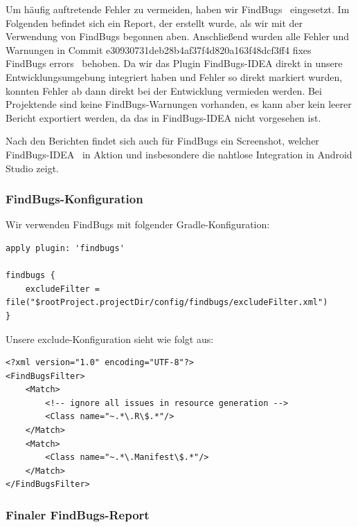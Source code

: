 
Um häufig auftretende Fehler zu vermeiden, haben wir \glqq FindBugs\grqq~ eingesetzt. Im Folgenden befindet sich ein Report, der erstellt wurde, als wir mit der Verwendung von FindBugs begonnen aben. Anschließend wurden alle Fehler und Warnungen in Commit e30930731deb28b4af37f4d820a163f48dcf3ff4 \glqq fixes FindBugs errors\grqq~ behoben. Da wir das Plugin FindBugs-IDEA direkt in unsere Entwicklungsumgebung integriert haben und Fehler so direkt markiert wurden, konnten Fehler ab dann direkt bei der Entwicklung vermieden werden. Bei Projektende sind keine FindBugs-Warnungen vorhanden, es kann aber kein leerer Bericht exportiert werden, da das in FindBugs-IDEA nicht vorgesehen ist.

Nach den Berichten findet sich auch für FindBugs ein Screenshot, welcher \glqq FindBugs-IDEA\grqq~ in Aktion und insbesondere die nahtlose Integration in Android Studio zeigt.

\subsubsection{FindBugs-Konfiguration}

Wir verwenden FindBugs mit folgender Gradle-Konfiguration:

\begin{lstlisting}
apply plugin: 'findbugs'

findbugs {
    excludeFilter = file("$rootProject.projectDir/config/findbugs/excludeFilter.xml")
}
\end{lstlisting}

Unsere exclude-Konfiguration sieht wie folgt aus:

\begin{lstlisting}
<?xml version="1.0" encoding="UTF-8"?>
<FindBugsFilter>
    <Match>
        <!-- ignore all issues in resource generation -->
        <Class name="~.*\.R\$.*"/>
    </Match>
    <Match>
        <Class name="~.*\.Manifest\$.*"/>
    </Match>
</FindBugsFilter>
\end{lstlisting}




\subsubsection{Finaler FindBugs-Report}

